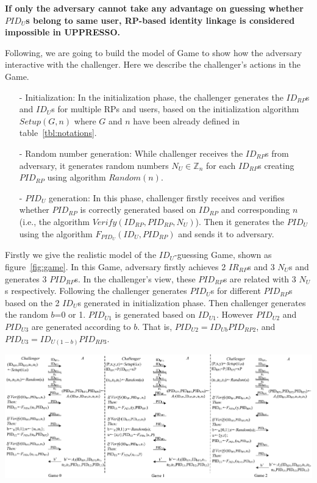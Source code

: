 {\textbf{If only the adversary cannot take any advantage on guessing whether $PID_U$s belong to same user, RP-based identity linkage is considered impossible in UPPRESSO.}


Following, we are going to build the model of Game to show how the adversary interactive with the challenger. Here we describe the challenger's actions in the Game.
\begin{itemize}
\vspace{-\topsep}
\item[-] Initialization: In the initialization phase, the challenger generates the $ID_{RP}$s and $ID_U$s for multiple RPs and users, based on the initialization algorithm $Setup(G,n)$ where $G$ and $n$ have been already defined in table~\ref{tbl:notations}.
\vspace{-\topsep}
\item[-] Random number generation: While challenger receives the $ID_{RP}$s from adversary, it generates random numbers $N_U \in \mathbb{Z}_n$ for each $ID_{RP}$s creating $PID_{RP}$ using algorithm $Random(n)$.
\vspace{-\topsep}
\item[-] $PID_U$ generation: In this phase, challenger firstly receives and  verifies whether $PID_{RP}$ is correctly generated based on $ID_{RP}$ and corresponding $n$ (i.e., the algorithm $Verify(ID_{RP},PID_{RP},N_U)$). Then it generates the $PID_U$ using the algorithm $F_{PID_U}(ID_U,PID_{RP})$ and sends it to adversary.
\end{itemize}
\vspace{-\topsep}
Firstly we give the realistic model of the $ID_U$-guessing Game, shown as figure~\ref{fig:game}. In this Game, adversary firstly achieves 2 $IR_{RP}$s and 3 $N_U$s and generates 3 $PID_{RP}$s. In the challenger's view, these $PID_{RP}$s are related with 3 $N_U$s respectively. Following the challenger generates $PID_U$s for different $PID_{RP}$s based on the 2 $ID_U$s generated in initialization phase. 
Then challenger generates the random $b$=0 or 1. $PID_{U1}$ is generated based on $ID_{U1}$. However $PID_{U2}$ and $PID_{U3}$ are generated according to $b$. That is, $PID_{U2}=ID_{Ub}PID_{RP2}$, and $PID_{U3}=ID_{U(1-b)}PID_{RP3}$.  
\begin{strip}
\centering\includegraphics[width=\textwidth]{fig/game.pdf}
\label{fig:game}
\vspace{-5mm}
\end{strip}

}
